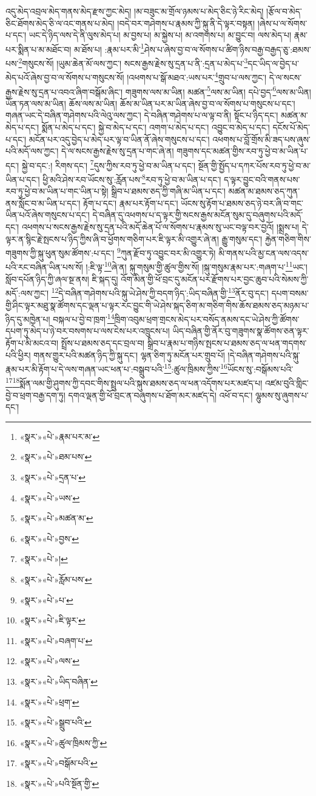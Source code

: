 འདུ་མེད་འབྲལ་མེད་གནས་མེད་རྫས་ཀྱང་མེད། །མ་བཟུང་མ་གྲོལ་ཉམས་པ་མེད་ཅིང་ཉེ་རིང་མེད། །རྩོལ་བ་མེད་ཅིང་ཐོགས་མེད་ཅི་ལ་འང་གནས་པ་མེད། །བདེ་བར་གཤེགས་པ་རྣམས་ཀྱི་སྐུ་ནི་དེ་ལྟར་བསྟན། །ཞེས་པ་ལ་སོགས་པ་དང་། ཡང་དེ་ཉིད་ལས་དེ་ནི་ལུས་མེད་པ། མ་བྱས་པ། མ་སྐྱེས་པ། མ་འགགས་པ། མ་བྱུང་བ། ལས་མེད་པ། རྣམ་པར་སྨིན་པ་མ་མཐོང་བ། མ་ཐོས་པ། :རྣམ་པར་མི་\footnote{«སྣར་»«པེ་»རྣམ་པར་མ་}ཤེས་པ་ཞེས་བྱ་བ་ལ་སོགས་པ་ཚིག་ཉིས་བརྒྱ་བརྒྱད་ཅུ་:ཐམས་པས་\footnote{«སྣར་»«པེ་»ཐམ་པས་}གསུངས་སོ། །ཡུམ་ཆེན་མོ་ལས་ཀྱང་། སངས་རྒྱས་རྗེས་སུ་དྲན་པ་ནི་:དྲན་པ་མེད་པ་\footnote{«སྣར་»«པེ་»དྲན་པ་}དང་ཡིད་ལ་བྱེད་པ་མེད་པའོ་ཞེས་བྱ་བ་ལ་སོགས་པ་གསུངས་སོ། །འཕགས་པ་སྒོ་མཐའ་:ཡས་པར་\footnote{«སྣར་»«པེ་»ཡས་}གྲུབ་པ་ལས་ཀྱང་། དེ་ལ་སངས་རྒྱས་རྗེས་སུ་དྲན་པ་འབའ་ཞིག་བསྒོམ་ཞིང་། གཟུགས་ལས་མ་ཡིན། མཚན་\footnote{«སྣར་»«པེ་»མཚན་མ་}ལས་མ་ཡིན། དཔེ་བྱད་\footnote{«སྣར་»«པེ་»བྱས་}ལས་མ་ཡིན། ཡོན་ཏན་ལས་མ་ཡིན། ཆོས་ལས་མ་ཡིན། ཆོས་མ་ཡིན་པར་མ་ཡིན་ཞེས་བྱ་བ་ལ་སོགས་པ་གསུངས་པ་དང་། གཞན་ཡང་དེ་བཞིན་གཤེགས་པའི་ལེའུ་ལས་ཀྱང་། དེ་བཞིན་གཤེགས་པ་ལ་ལྟ་བ་ནི། སྟོང་པ་ཉིད་དང་། མཚན་མ་མེད་པ་དང་། སྨོན་པ་མེད་པ་དང་། སྐྱེ་བ་མེད་པ་དང་། འགག་པ་མེད་པ་དང་། འབྱུང་བ་མེད་པ་དང་། དངོས་པོ་མེད་པ་དང་། མངོན་པར་འདུ་བྱེད་པ་མེད་པར་ལྟ་བ་ཡིན་ནོ་ཞེས་གསུངས་པ་དང་། འཕགས་པ་བློ་གྲོས་མི་ཟད་པས་ཞུས་པའི་མདོ་ལས་ཀྱང་། དེ་ལ་སངས་རྒྱས་རྗེས་སུ་དྲན་པ་གང་ཞེ་ན། གཟུགས་དང་མཚན་གྱིས་རབ་ཏུ་ཕྱེ་བ་མ་ཡིན་པ་དང་། སྐྱེ་བ་དང་:། རིགས་དང་། \footnote{«སྣར་»«པེ་»།  }དུས་ཀྱིས་རབ་ཏུ་ཕྱེ་བ་མ་ཡིན་པ་དང་། སྔོན་གྱི་སྤྱོད་པ་དཀར་པོས་རབ་ཏུ་ཕྱེ་བ་མ་ཡིན་པ་དང་། ཕྱི་མའི་ཤེས་རབ་ཡོངས་སུ་:རློན་པས་\footnote{«སྣར་»«པེ་»རློམ་པས་}རབ་ཏུ་ཕྱེ་བ་མ་ཡིན་པ་དང་། ད་ལྟར་བྱུང་བའི་གནས་པས་རབ་ཏུ་ཕྱེ་བ་མ་ཡིན་པ་གང་ཡིན་པ་སྟེ། སྒྲིབ་པ་ཐམས་ཅད་ཀྱི་གཞི་མ་ཡིན་པ་དང་། མཚན་མ་ཐམས་ཅད་ཀུན་ནས་སློང་བ་མ་ཡིན་པ་དང་། རྟོག་པ་དང་། རྣམ་པར་རྟོག་པ་དང་། ཡོངས་སུ་རྟོག་པ་ཐམས་ཅད་ཉེ་བར་ཞི་བ་གང་ཡིན་པའོ་ཞེས་གསུངས་པ་དང་། དེ་བཞིན་དུ་འཕགས་པ་ད་ལྟར་གྱི་སངས་རྒྱས་མངོན་སུམ་དུ་བཞུགས་པའི་མདོ་དང་། འཕགས་པ་སངས་རྒྱས་རྗེས་སུ་དྲན་པའི་མདོ་ཆེན་པོ་ལ་སོགས་པ་རྣམས་སུ་ཡང་བལྟ་བར་བྱའོ། །སྨྲས་པ། དེ་ལྟར་ན་སྙིང་རྗེ་སྤངས་པ་ཉིད་ཀྱིས་ཞི་བ་ཕྱོགས་གཅིག་པར་ཇི་ལྟར་མི་འགྱུར་ཞེ་ན། རྒྱུ་གསུམ་དང་། རྐྱེན་གཅིག་གིས་གཟུགས་ཀྱི་སྐུ་ཕུན་སུམ་ཚོགས་:པ་དང་། \footnote{«སྣར་»«པེ་»པ་}ཀུན་རྫོབ་ཏུ་འབྱུང་བར་མི་འགྱུར་ཏེ། མི་གནས་པའི་མྱ་ངན་ལས་འདས་པའི་རང་བཞིན་ཡིན་པས་སོ། །:ཇི་ལྟ་\footnote{«སྣར་»«པེ་»ཇི་ལྟར་}ཞེ་ན། སྐུ་གསུམ་གྱི་ཚུལ་གྱིས་སོ། །སྐུ་གསུམ་རྣམ་པར་:གཞག་པ་\footnote{«སྣར་»«པེ་»བཞག་པ་}ཡང་། སློབ་དཔོན་ཉིད་ཀྱི་ཞལ་སྔ་ནས། ཇི་སྐད་དུ། འོག་མིན་གྱི་ཕོ་བྲང་དུ་མངོན་པར་རྫོགས་པར་བྱང་ཆུབ་པའི་སེམས་ཀྱི་མདོ་:ལས་ཀྱང་། \footnote{«སྣར་»«པེ་»ལས་}དེ་བཞིན་གཤེགས་པའི་སྐུ་ཡེ་ཤེས་ཀྱི་བདག་ཉིད་:ཡིད་བཞིན་གྱི་\footnote{«སྣར་»«པེ་»ཡིད་བཞིན་}ནོར་བུ་དང་། དཔག་བསམ་གྱི་ཤིང་ལྟར་མཐུ་སྣ་ཚོགས་དང་ལྡན་པ་ལྟར་རང་བྱུང་གི་ཡེ་ཤེས་སྐད་ཅིག་མ་གཅིག་གིས་ཆོས་ཐམས་ཅད་མཉམ་པ་ཉིད་དུ་མཁྱེན་པ། བསྐལ་པ་བྱེ་བ་ཁྲག་\footnote{«སྣར་»«པེ་»ཕྲག་}ཁྲིག་འབུམ་ཕྲག་གྲངས་མེད་པར་བསོད་ནམས་དང་ཡེ་ཤེས་ཀྱི་ཚོགས་དཔག་ཏུ་མེད་པ་ཉེ་བར་བསགས་པ་ལས་ངེས་པར་འཁྲུངས་པ། ཡིད་བཞིན་གྱི་ནོར་བུ་གཟུགས་སྣ་ཚོགས་ཅན་ལྟར་རྟོག་པ་མི་མངའ་བ། སྤྲོས་པ་ཐམས་ཅད་དང་བྲལ་བ། སྒྲིབ་པ་རྣམ་པ་གཉིས་སྤངས་པ་ཐམས་ཅད་ལ་ཕན་གདགས་པའི་ཕྱིར། གནས་གྱུར་པའི་མཚན་ཉིད་ཀྱི་སྐུ་དང་། ལྷན་ཅིག་ཏུ་མངོན་པར་གྲུབ་པོ། །དེ་བཞིན་གཤེགས་པའི་སྐུ་རྣམ་པར་མི་རྟོག་པ་དེ་ལས་གཞན་ཡང་ཕན་པ་:བསྒྲུབ་པའི་\footnote{«སྣར་»«པེ་»སྒྲུབ་པའི་}:ཚུལ་ཁྲིམས་ཀྱིས་\footnote{«སྣར་»«པེ་»ཚུལ་ཁྲིམས་ཀྱི་}ཡོངས་སུ་:བསྒོམས་པའི་\footnote{«སྣར་»«པེ་»བསྒོམ་པའི་}\footnote{«སྣར་»«པེ་»པའི་སྔོན་གྱི་}སྨོན་ལམ་གྱི་ཤུགས་ཀྱི་དབང་གིས་སྤྲུལ་པའི་སྐུས་ཐམས་ཅད་ལ་ཕན་འདོགས་པར་མཛད་པ། འཛམ་བུའི་གླིང་བྱེ་བ་ཕྲག་བརྒྱ་དག་ཏུ། དགའ་ལྡན་གྱི་ཕོ་བྲང་ན་བཞུགས་པ་ཐོག་མར་མཛད་དེ། འཕོ་བ་དང་། ལྷུམས་སུ་ཞུགས་པ་དང་། 